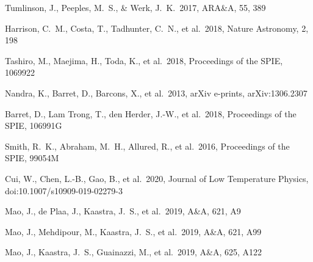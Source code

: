 \documentclass[letterpaper,11pt]{article}
\newcommand{\aap}{A\&A}
\newcommand{\araa}{ARA\&A}
\newcommand{\procspie}{Proceedings of the SPIE}
\begin{document}
\setlength{\bibsep}{2pt plus 5ex}
\begin{multicols}{2}
\small
\begin{thebibliography}{}
 Tumlinson, J., Peeples, M.~S., \& Werk, J.~K.\ 2017, \araa, 55, 389

 Harrison, C.~M., Costa, T., Tadhunter, C.~N., et al.\ 2018, Nature Astronomy, 2, 198

 Tashiro, M., Maejima, H., Toda, K., et al.\ 2018, \procspie, 1069922

 Nandra, K., Barret, D., Barcons, X., et al.\ 2013, arXiv e-prints, arXiv:1306.2307

 Barret, D., Lam Trong, T., den Herder, J.-W., et al.\ 2018, \procspie, 106991G

 Smith, R.~K., Abraham, M.~H., Allured, R., et al.\ 2016, \procspie, 99054M

 Cui, W., Chen, L.-B., Gao, B., et al.\ 2020, Journal of Low Temperature Physics, doi:10.1007/s10909-019-02279-3

 Mao, J., de Plaa, J., Kaastra, J.~S., et al.\ 2019, \aap, 621, A9

 Mao, J., Mehdipour, M., Kaastra, J.~S., et al.\ 2019, \aap, 621, A99

 Mao, J., Kaastra, J.~S., Guainazzi, M., et al.\ 2019, \aap, 625, A122


\end{thebibliography}
\end{multicols}
\end{document}
